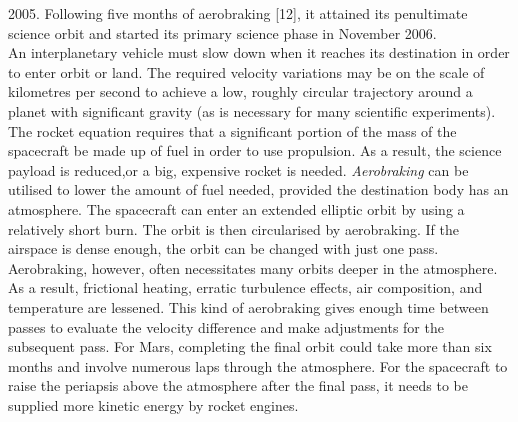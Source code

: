 \documentclass[conference]{IEEEtran}
\begin{document}
2005. Following five months of aerobraking [12], it attained its penultimate science orbit and started its primary science phase in November 2006. \\

An interplanetary vehicle must slow down when it reaches its destination in order to enter orbit or land. The required velocity variations may be on the scale of kilometres per second to achieve a low, roughly circular trajectory around a planet with significant gravity (as is necessary for many scientific experiments). The rocket equation requires that a significant portion of the mass of the spacecraft be made up of fuel in order to use propulsion. As a result, the science payload is reduced,or a big, expensive rocket is needed. \textit{Aerobraking} can be utilised to lower the amount of fuel needed, provided the destination body has an atmosphere. The spacecraft can enter an extended elliptic orbit by using a relatively short burn. The orbit is then circularised by aerobraking. If the airspace is dense enough, the orbit can be changed with just one pass. Aerobraking, however, often necessitates many orbits deeper in the atmosphere. As a result, frictional heating, erratic turbulence effects, air composition, and temperature are lessened. This kind of aerobraking gives enough time between passes to evaluate the velocity difference and make adjustments for the subsequent pass. For Mars, completing the final orbit could take more than six months and involve numerous laps through the atmosphere. For the spacecraft to raise the periapsis above the atmosphere after the final pass, it needs to be supplied more kinetic energy by rocket engines.
\end{document}

